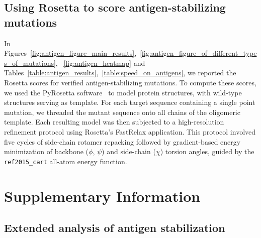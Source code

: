 \subsection{Using Rosetta to score antigen-stabilizing mutations}
In Figures~\ref{fig:antigen_figure_main_results},~\ref{fig:antigen_figure_of_different_types_of_mutations},
~\ref{fig:antigen_heatmap} and Tables~\ref{table:antigen_results},~\ref{table:speed_on_antigens}, we reported the Rosetta
scores for verified antigen-stabilizing mutations.
To compute these scores, we used the
PyRosetta software~\citep{chaudhury_pyrosetta_2010} to model protein structures, with wild-type
structures serving as template.
For each target sequence containing a single point mutation, we threaded the mutant sequence onto
all chains of the oligomeric template. Each resulting model was then subjected to a high-resolution
refinement protocol using Rosetta's FastRelax application. This protocol involved five cycles of
side-chain rotamer repacking followed by gradient-based energy minimization of backbone ($\phi$,
$\psi$) and side-chain ($\chi$) torsion angles, guided by the \texttt{ref2015\_cart} all-atom energy
function.



\section*{Supplementary Information}




\subsection*{Extended analysis of antigen stabilization}

